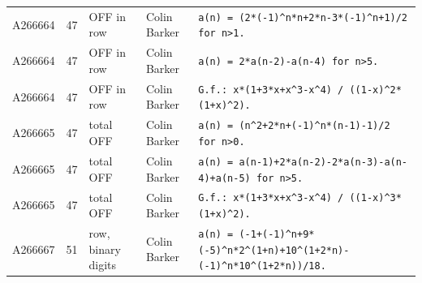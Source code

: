 \documentclass[11pt]{article}
\theoremstyle{definition}
\theoremstyle{remark}
\begin{document}
{\begin{longtable}{p{1.3cm}p{0.7cm}p{2.4cm}p{2.3cm}p{7.3cm}}
A266664 & 47 & OFF in row & Colin Barker & \texttt{a(n)\allowbreak{} \allowbreak{}=\allowbreak{} \allowbreak{}(2*\allowbreak{}(-\allowbreak{}1)\allowbreak{}\^{}n*\allowbreak{}n+\allowbreak{}2*\allowbreak{}n-\allowbreak{}3*\allowbreak{}(-\allowbreak{}1)\allowbreak{}\^{}n+\allowbreak{}1)\allowbreak{}/\allowbreak{}2 \allowbreak{}for \allowbreak{}n>1.} \\
A266664 & 47 & OFF in row & Colin Barker & \texttt{a(n)\allowbreak{} \allowbreak{}=\allowbreak{} \allowbreak{}2*\allowbreak{}a(n-\allowbreak{}2)\allowbreak{}-\allowbreak{}a(n-\allowbreak{}4)\allowbreak{} \allowbreak{}for \allowbreak{}n>5.} \\
A266664 & 47 & OFF in row & Colin Barker & \texttt{G.f.: \allowbreak{}x*\allowbreak{}(1+\allowbreak{}3*\allowbreak{}x+\allowbreak{}x\^{}3-\allowbreak{}x\^{}4)\allowbreak{} \allowbreak{}/\allowbreak{} \allowbreak{}((1-\allowbreak{}x)\allowbreak{}\^{}2*\allowbreak{}(1+\allowbreak{}x)\allowbreak{}\^{}2)\allowbreak{}.} \\
A266665 & 47 & total OFF & Colin Barker & \texttt{a(n)\allowbreak{} \allowbreak{}=\allowbreak{} \allowbreak{}(n\^{}2+\allowbreak{}2*\allowbreak{}n+\allowbreak{}(-\allowbreak{}1)\allowbreak{}\^{}n*\allowbreak{}(n-\allowbreak{}1)\allowbreak{}-\allowbreak{}1)\allowbreak{}/\allowbreak{}2 \allowbreak{}for \allowbreak{}n>0.} \\
A266665 & 47 & total OFF & Colin Barker & \texttt{a(n)\allowbreak{} \allowbreak{}=\allowbreak{} \allowbreak{}a(n-\allowbreak{}1)\allowbreak{}+\allowbreak{}2*\allowbreak{}a(n-\allowbreak{}2)\allowbreak{}-\allowbreak{}2*\allowbreak{}a(n-\allowbreak{}3)\allowbreak{}-\allowbreak{}a(n-\allowbreak{}4)\allowbreak{}+\allowbreak{}a(n-\allowbreak{}5)\allowbreak{} \allowbreak{}for \allowbreak{}n>5.} \\
A266665 & 47 & total OFF & Colin Barker & \texttt{G.f.: \allowbreak{}x*\allowbreak{}(1+\allowbreak{}3*\allowbreak{}x+\allowbreak{}x\^{}3-\allowbreak{}x\^{}4)\allowbreak{} \allowbreak{}/\allowbreak{} \allowbreak{}((1-\allowbreak{}x)\allowbreak{}\^{}3*\allowbreak{}(1+\allowbreak{}x)\allowbreak{}\^{}2)\allowbreak{}.} \\
A266667 & 51 & row, binary digits & Colin Barker & \texttt{a(n)\allowbreak{} \allowbreak{}=\allowbreak{} \allowbreak{}(-\allowbreak{}1+\allowbreak{}(-\allowbreak{}1)\allowbreak{}\^{}n+\allowbreak{}9*\allowbreak{}(-\allowbreak{}5)\allowbreak{}\^{}n*\allowbreak{}2\^{}(1+\allowbreak{}n)\allowbreak{}+\allowbreak{}10\^{}(1+\allowbreak{}2*\allowbreak{}n)\allowbreak{}-\allowbreak{}(-\allowbreak{}1)\allowbreak{}\^{}n*\allowbreak{}10\^{}(1+\allowbreak{}2*\allowbreak{}n)\allowbreak{})\allowbreak{}/\allowbreak{}18.} \\

\end{longtable}}
\end{document}
